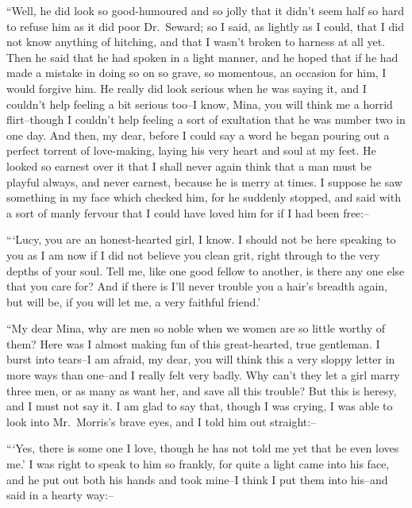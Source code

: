 \documentclass[12pt,openright]{book}
\begin{document}
“Well, he did look so good-humoured and so jolly that it didn’t seem half so hard to refuse him as it did poor Dr. Seward; so I said, as lightly as I could, that I did not know anything of hitching, and that I wasn’t broken to harness at all yet. Then he said that he had spoken in a light manner, and he hoped that if he had made a mistake in doing so on so grave, so momentous, an occasion for him, I would forgive him. He really did look serious when he was saying it, and I couldn’t help feeling a bit serious too–I know, Mina, you will think me a horrid flirt–though I couldn’t help feeling a sort of exultation that he was number two in one day. And then, my dear, before I could say a word he began pouring out a perfect torrent of love-making, laying his very heart and soul at my feet. He looked so earnest over it that I shall never again think that a man must be playful always, and never earnest, because he is merry at times. I suppose he saw something in my face which checked him, for he suddenly stopped, and said with a sort of manly fervour that I could have loved him for if I had been free:–

“‘Lucy, you are an honest-hearted girl, I know. I should not be here speaking to you as I am now if I did not believe you clean grit, right through to the very depths of your soul. Tell me, like one good fellow to another, is there any one else that you care for? And if there is I’ll never trouble you a hair’s breadth again, but will be, if you will let me, a very faithful friend.’

“My dear Mina, why are men so noble when we women are so little worthy of them? Here was I almost making fun of this great-hearted, true gentleman. I burst into tears–I am afraid, my dear, you will think this a very sloppy letter in more ways than one–and I really felt very badly. Why can’t they let a girl marry three men, or as many as want her, and save all this trouble? But this is heresy, and I must not say it. I am glad to say that, though I was crying, I was able to look into Mr. Morris’s brave eyes, and I told him out straight:–

“‘Yes, there is some one I love, though he has not told me yet that he even loves me.’ I was right to speak to him so frankly, for quite a light came into his face, and he put out both his hands and took mine–I think I put them into his–and said in a hearty way:–
\end{document}
